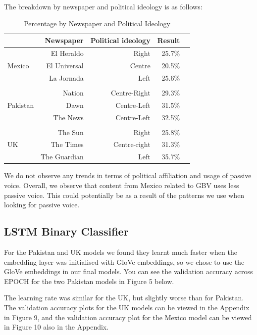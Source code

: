 \documentclass{article}
\begin{document}
{{The breakdown by newspaper and political ideology is as follows:

\begin{table}[!htp]\centering
	\caption{Percentage by Newspaper and Political Ideology}\label{tab: }
	\scriptsize
	\begin{tabular}{lrrrr}\toprule
		&\textbf{Newspaper} &\textbf{Political ideology} &\textbf{Result} \\\midrule
		\multirow{3}{*}{Mexico} &El Heraldo &Right &25.7\% \\
		&El Universal &Centre &20.5\% \\
		&La Jornada &Left &25.6\%\\
		& & &\textbf{} \\
		\multirow{3}{*}{Pakistan} &Nation &Centre-Right &29.3\% \\
		&Dawn &Centre-Left &31.5\% \\
		&The News &Centre-Left &32.5\% \\
		&\textbf{} &\textbf{} &\textbf{} \\
		\multirow{3}{*}{UK} &The Sun &Right &25.8\% \\
		&The Times &Centre-right &31.3\%\\
		&The Guardian &Left &35.7\%\\
		\bottomrule
	\end{tabular}
\end{table}

 
 We do not observe any trends in terms of political affiliation and usage of passive voice. Overall, we observe that content from Mexico related to GBV uses less passive voice. This could potentially be as a result of the patterns we use when looking for passive voice.

}


\subsection{LSTM Binary Classifier}{

For the Pakistan and UK models we found they learnt much faster when the embedding layer was initialised with GloVe embeddings, so we chose to use the GloVe embeddings in our final models. You can see the validation accuracy across EPOCH for the two Pakistan models in Figure 5 below. 

The learning rate was similar for the UK, but slightly worse than for Pakistan. The validation accuracy plots for the UK models can be viewed in the Appendix in Figure 9, and the validation accuracy plot for the Mexico model can be viewed in Figure 10 also in the Appendix. 

}}
\end{document}
